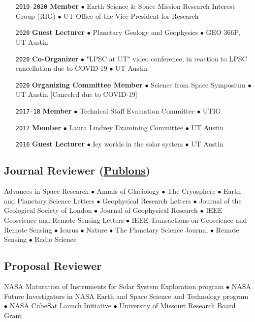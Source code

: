 \begin{itemize}[leftmargin=5.8em, labelsep=1.5em]
    \item[\texttt{2019-2020}] \textbf{Member} $\bullet$ Earth Science \& Space Mission Research Interest Group (RIG) $\bullet$ UT Office of the Vice President for Research
    \item[\texttt{2020}] \textbf{Guest Lecturer} $\bullet$ Planetary Geology and Geophysics $\bullet$  GEO 366P, UT Austin
    \item[\texttt{2020}] \textbf{Co-Organizer} $\bullet$ "LPSC at UT" video conference, in reaction to LPSC cancellation due to COVID-19 $\bullet$ UT Austin
    \item[\texttt{2020}] \textbf{Organizing Committee Member} $\bullet$ Science from Space Symposium $\bullet$ UT Austin [Canceled due to COVID-19]
    \item[\texttt{2017-18}] \textbf{Member} $\bullet$ Technical Staff Evaluation Committee $\bullet$ UTIG
    \item[\texttt{2017}] \textbf{Member} $\bullet$ Laura Lindzey Examining Committee $\bullet$ UT Austin
    \item[\texttt{2016}] \textbf{Guest Lecturer} $\bullet$ Icy worlds in the solar system $\bullet$ UT Austin
\end{itemize}

\vspace{-2em}
\subsection*{Journal Reviewer (\href{https://publons.com/author/1177202/cyril-grima\#profile}{Publons})}

Advances in Space Research $\bullet$ Annals of Glaciology $\bullet$ The Cryosphere $\bullet$ Earth and Planetary Science Letters $\bullet$ Geophysical Research Letters $\bullet$ Journal of the Geological Society of London $\bullet$ Journal of Geophysical Research $\bullet$ IEEE Geoscience and Remote Sensing Letters $\bullet$ IEEE Transactions on Geoscience and Remote Sensing $\bullet$ Icarus $\bullet$ Nature $\bullet$ The Planetary Science Journal $\bullet$ Remote Sensing $\bullet$ Radio Science

\vspace{-1em}
\subsection*{Proposal Reviewer}
NASA Maturation of Instruments for Solar System Exploration program $\bullet$ NASA Future Investigators in NASA Earth and Space Science and Technology program $\bullet$ NASA CubeSat Launch Initiative $\bullet$ University of Missouri Research Board Grant

